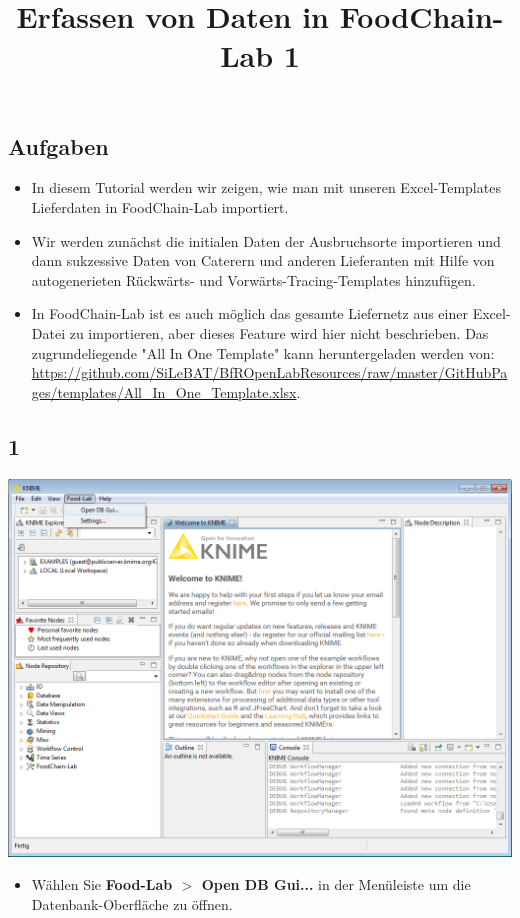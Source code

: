 \documentclass{beamer}
\title{Erfassen von Daten in FoodChain-Lab 1}
\date{}
\begin{document}
\maketitle

\section{ }

\subsection{Aufgaben}
\begin{frame}
	\begin{itemize}
		\item In diesem Tutorial werden wir zeigen, wie man mit unseren Excel-Templates Lieferdaten in FoodChain-Lab importiert.
		\item Wir werden zunächst die initialen Daten der Ausbruchsorte importieren und dann sukzessive Daten von Caterern und anderen Lieferanten mit Hilfe von autogenerieten Rückwärts- und Vorwärts-Tracing-Templates hinzufügen.
		\item In FoodChain-Lab ist es auch möglich das gesamte Liefernetz aus einer Excel-Datei zu importieren, aber dieses Feature wird hier nicht beschrieben. Das zugrundeliegende "All In One Template" kann heruntergeladen werden von: \url{https://github.com/SiLeBAT/BfROpenLabResources/raw/master/GitHubPages/templates/All_In_One_Template.xlsx}.
	\end{itemize}
\end{frame}
 
\subsection{1}
\begin{frame}
	\begin{center}
  		\includegraphics[height=0.6\textheight]{1.png}
	\end{center}
	\begin{itemize}
		\item Wählen Sie \textbf{Food-Lab $>$ Open DB Gui...} in der Menüleiste um die Datenbank-Oberfläche zu öffnen.
	\end{itemize}
\end{frame}
\end{document}
